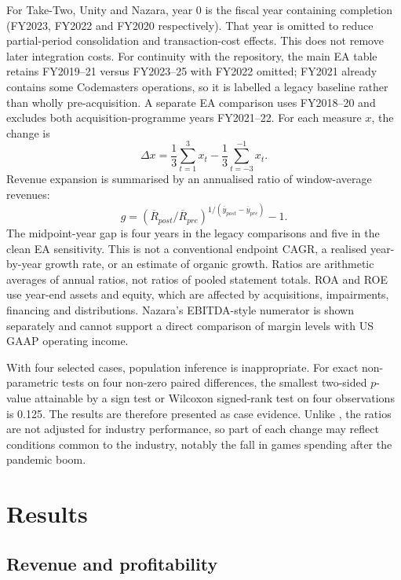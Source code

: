 \documentclass[11pt]{article}
\begin{document}
For Take-Two, Unity and Nazara, year 0 is the fiscal year containing completion (FY2023, FY2022 and FY2020 respectively). That year is omitted to reduce partial-period consolidation and transaction-cost effects. This does not remove later integration costs. For continuity with the repository, the main EA table retains FY2019--21 versus FY2023--25 with FY2022 omitted; FY2021 already contains some Codemasters operations, so it is labelled a legacy baseline rather than wholly pre-acquisition. A separate EA comparison uses FY2018--20 and excludes both acquisition-programme years FY2021--22. For each measure $x$, the change is
\begin{equation}
\Delta x = \frac{1}{3}\sum_{t=1}^{3} x_{t} - \frac{1}{3}\sum_{t=-3}^{-1} x_{t}.\label{eq:change}
\end{equation}
Revenue expansion is summarised by an annualised ratio of window-average revenues:
\begin{equation}
g=\left(\overline{R}_{post}/\overline{R}_{pre}\right)^{1/(\overline{y}_{post}-\overline{y}_{pre})}-1.
\end{equation}
The midpoint-year gap is four years in the legacy comparisons and five in the clean EA sensitivity. This is not a conventional endpoint CAGR, a realised year-by-year growth rate, or an estimate of organic growth. Ratios are arithmetic averages of annual ratios, not ratios of pooled statement totals. ROA and ROE use year-end assets and equity, which are affected by acquisitions, impairments, financing and distributions. Nazara's EBITDA-style numerator is shown separately and cannot support a direct comparison of margin levels with US GAAP operating income.

With four selected cases, population inference is inappropriate. For exact non-parametric tests on four non-zero paired differences, the smallest two-sided $p$-value attainable by a sign test or Wilcoxon signed-rank test on four observations is 0.125. The results are therefore presented as case evidence. Unlike \citet{healy1992}, the ratios are not adjusted for industry performance, so part of each change may reflect conditions common to the industry, notably the fall in games spending after the pandemic boom.

\section{Results}\label{sec:results}

\subsection{Revenue and profitability}
\end{document}
